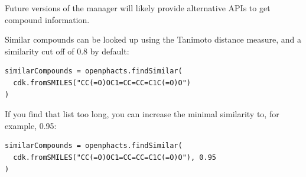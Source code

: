 \documentclass{book}
\begin{document}
\begin{refsection}
Future versions of the manager will likely provide alternative APIs to
get compound information.

Similar compounds can be looked up using the Tanimoto distance measure,
and a similarity cut off of 0.8 by default:

\begin{Verbatim}
similarCompounds = openphacts.findSimilar(
  cdk.fromSMILES("CC(=O)OC1=CC=CC=C1C(=O)O")
)
\end{Verbatim}

If you find that list too long, you can increase the minimal similarity to,
for example, 0.95:

\begin{Verbatim}
similarCompounds = openphacts.findSimilar(
  cdk.fromSMILES("CC(=O)OC1=CC=CC=C1C(=O)O"), 0.95
)
\end{Verbatim}


\printbibliography[heading=subbibliography]
\end{refsection}


\cleardoublepage
\printindex
\end{document}
